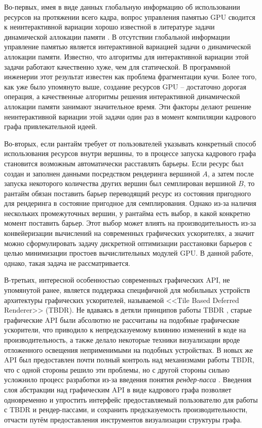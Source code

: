 Во-первых, имея в виде данных глобальную информацию об использовании ресурсов на протяжении всего кадра, вопрос управления памятью GPU сводится к неинтерактивной вариации хорошо известной в литературе задачи динамической аллокации памяти \cite[с. 226]{10.5555/574848}.
В отсутствии глобальной информации управление памятью является интерактивной вариацией задачи о динамической аллокации памяти.
Известно, что алгоритмы для интерактивной вариации этой задачи работают качественно хуже, чем для статической.
В программной инженерии этот результат известен как проблема фрагментации кучи.
Более того, как уже было упомянуто выше, создание ресурсов GPU -- достаточно дорогая операция, а качественные алгоритмы решения интерактивной динамической аллокации памяти занимают значительное время.
Эти факторы делают решение неинтерактивной вариации этой задачи один раз в момент компиляции кадрового графа привлекательной идеей.

Во-вторых, если рантайм требует от пользователей указывать конкретный способ использования ресурсов внутри вершины, то в процессе запуска кадрового графа становится возможным автоматически расставлять барьеры.
Если ресурс был создан и заполнен данными посредством рендеринга вершиной $A$, а затем после запуска некоторого количества других вершин был семплирован вершиной $B$, то рантайм обязан поставить барьер переводящий ресурс из состояния пригодного для рендеринга в состояние пригодное для семплирования.
Однако из-за наличия нескольких промежуточных вершин, у рантайма есть выбор, в какой конкретно момент поставить барьер.
Этот выбор может влиять на производительность из-за конвейеризации вычислений на современных графических ускорителях, а значит можно сформулировать задачу дискретной оптимизации расстановки барьеров с целью минимизации простоев вычислительных модулей GPU.
В данной работе, однако, такая задача не рассматривается.

В-третьих, интересной особенностью современных графических API, не упомянутой ранее, является поддержка специфичной для мобильных устройств архитектуры графических ускорителей, называемой <<Tile Based Deferred Renderer>> (TBDR).
Не вдаваясь в детяли принципов работы TBDR , старые графические API были абсолютно не рассчитаны на подобные графические ускорители, что приводило к непредсказуемому влиянию изменений в коде на производительность, а также делало некоторые техники визуализации вроде отложенного освещения неприменимыми на подобных устройствах.
В новых же API был предоставлен почти полный контроль над механизмами работы TBDR, что с одной стороны решило эти проблемы, но с другой стороны сильно усложнило процесс разработки из-за введения понятия \textit{рендер-пасса} \cite[раздел~8]{VulkanSpec}.
Введения слоя абстракции над графическим API в виде кадрового графа позволяет одновременно и упростить интерфейс предоставляемый пользователю для работы с TBDR и рендер-пассами, и сохранить предсказуемость производительности, отчасти путём предоставления инструментов визуализации структуры графа.

